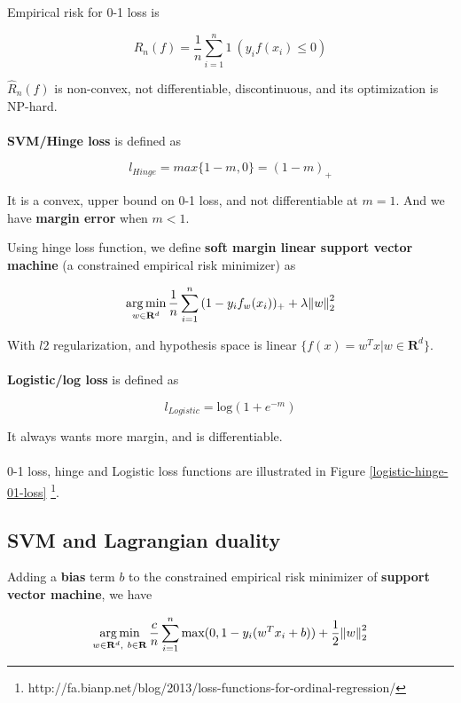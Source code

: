 \documentclass{article}
\DeclareMathOperator*{\argmin}{arg\,min}
\begin{document}
Empirical risk for 0-1 loss is

$$
\hat{R}_n(f) = \frac{1}{n} \sum_{i = 1}^{n}{1}~(y_i f(x_i) \leq 0)
$$

$\hat{R}_n(f)$ is non-convex, not differentiable, discontinuous, and its optimization is NP-hard.
\\
\\
\textbf{SVM/Hinge loss} is defined as

$$
\mathit{l}_{Hinge} = max\{ 1 - m, 0 \} = (1 - m)_+
$$

It is a convex, upper bound on 0-1 loss, and not differentiable at $m = 1$.
And we have \textbf{margin error} when $m < 1$.

Using hinge loss function, we define \textbf{soft margin linear support vector machine} (a constrained empirical risk minimizer) as

$$
\argmin_{w \in \mathbf{R}^{d}}{\frac{1}{n} \sum_{i = 1}^{n}{(1 - y_i f_w (x_i))_+} + \lambda \norm{w}_2^2}
$$

With $l2$ regularization, and hypothesis space is linear $\{f(x) = w^{T} x | w \in \mathbf{R}^d\}$.
\\
\\
\textbf{Logistic/log loss} is defined as 

$$
\mathit{l}_{Logistic} = \text{log}(1 + e^{-m})
$$

It always wants more margin, and is differentiable.
\\
\\
0-1 loss, hinge and Logistic loss functions are illustrated in Figure \ref{logistic-hinge-01-loss} \footnote{http://fa.bianp.net/blog/2013/loss-functions-for-ordinal-regression/}.


\subsection{SVM and Lagrangian duality}

Adding a \textbf{bias} term $b$ to the constrained empirical risk minimizer of \textbf{support vector machine}, we have

$$
\argmin_{w \in \mathbf{R}^{d}, ~ b \in \mathbf{R}}{\frac{c}{n} \sum_{i = 1}^{n}{\text{max}(0, 1 - y_i (w^{T} x_i + b))} + \frac{1}{2} {\norm{w}_2^2}}
$$
\end{document}
